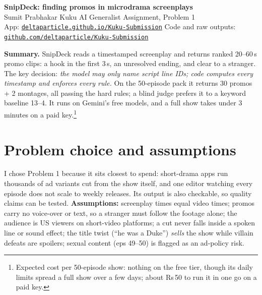 \documentclass[10pt]{article}
\begin{document}
\begin{center}
{\Large\bfseries SnipDeck: finding promos in microdrama screenplays}\\[4pt]
Sumit Prabhakar \textperiodcentered{} Kuku AI Generalist Assignment, Problem 1\\[1pt]
{\small App: \href{https://deltaparticle.github.io/Kuku-Submission/}{\texttt{deltaparticle.github.io/Kuku-Submission}}
\quad Code and raw outputs: \href{https://github.com/deltaparticle/Kuku-Submission}{\texttt{github.com/deltaparticle/Kuku-Submission}}}
\end{center}

\textbf{Summary.} SnipDeck reads a timestamped screenplay and returns ranked 20--60\,s promo clips: a hook in the
first 3\,s, an unresolved ending, and clear to a stranger. The key decision: \emph{the model may only name script line IDs;
code computes every timestamp and enforces every rule.} On the 50-episode pack it returns 30 promos + 2 montages,
all passing the hard rules; a blind judge prefers it to a keyword baseline 13--4. It runs on Gemini's free models, and
a full show takes under 3 minutes on a paid key.\footnote{Expected cost per 50-episode show: nothing on the free tier,
though its daily limits spread a full show over a few days; about Rs\,50 to run it in one go on a paid key.}

\section{Problem choice and assumptions}
I chose Problem 1 because it sits closest to spend: short-drama apps run thousands of ad variants cut from the show
itself, and one editor watching every episode does not scale to weekly releases. Its output is also checkable, so
quality claims can be tested. \textbf{Assumptions:} screenplay times equal video times; promos carry no voice-over or
text, so a stranger must follow the footage alone; the audience is US viewers on short-video platforms; a cut never
falls inside a spoken line or sound effect; the title twist (``he was a Duke'') \emph{sells} the show while villain
defeats are spoilers; sexual content (eps 49--50) is flagged as an ad-policy risk.
\end{document}
